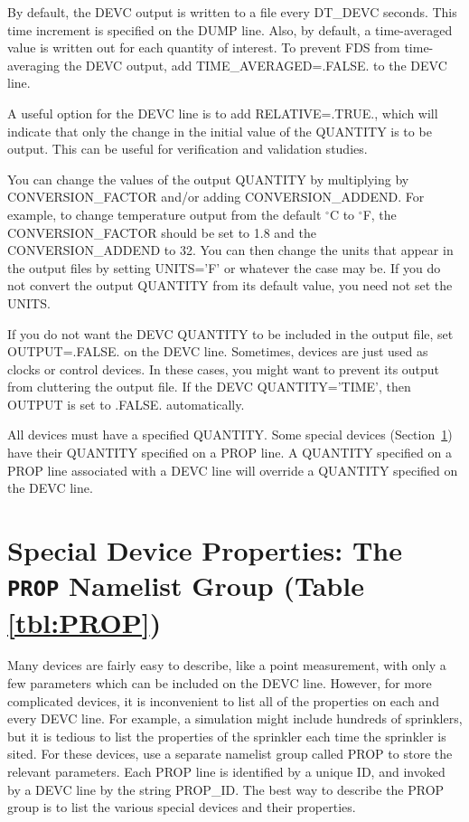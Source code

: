 \documentclass[11pt]{book}
\begin{document}
By default, the {\ct DEVC} output is written to a file every {\ct DT\_DEVC} seconds. This time increment is specified on the {\ct DUMP} line. Also, by default, a time-averaged value is written out for each quantity of interest. To prevent FDS from time-averaging the {\ct DEVC} output, add {\ct TIME\_AVERAGED=.FALSE.} to the {\ct DEVC} line.

A useful option for the {\ct DEVC} line is to add {\ct RELATIVE=.TRUE.}, which will indicate that only the change in the initial value of the {\ct QUANTITY} is to be output. This can be useful for verification and validation studies.

You can change the values of the output {\ct QUANTITY} by multiplying by {\ct CONVERSION\_FACTOR} and/or adding {\ct CONVERSION\_ADDEND}. For example, to change temperature output from the default $^\circ$C to $^\circ$F, the {\ct CONVERSION\_FACTOR} should be set to 1.8 and the {\ct CONVERSION\_ADDEND} to 32. You can then change the units that appear in the output files by setting {\ct UNITS='F'} or whatever the case may be. If you do not convert the output {\ct QUANTITY} from its default value, you need not set the {\ct UNITS}.

If you do not want the {\ct DEVC} {\ct QUANTITY} to be included in the output file, set {\ct OUTPUT=.FALSE.} on the {\ct DEVC} line. Sometimes, devices are just used as clocks or control devices. In these cases, you might want to prevent its output from cluttering the output file. If the {\ct DEVC} {\ct QUANTITY='TIME'}, then {\ct OUTPUT} is set to {\ct .FALSE.} automatically.

All devices must have a specified {\ct QUANTITY}.  Some special devices (Section~\ref{info:PROP}) have their {\ct QUANTITY} specified on a {\ct PROP} line. A {\ct QUANTITY} specified on a {\ct PROP} line associated with a {\ct DEVC} line will override a {\ct QUANTITY} specified on the {\ct DEVC} line.



\newpage

\section{Special Device Properties: The \texorpdfstring{{\tt PROP}}{PROP} Namelist Group (Table \ref{tbl:PROP})}
\label{info:PROP}

Many devices are fairly easy to describe, like a point measurement, with only a few parameters which can be included on the {\ct DEVC} line. However, for more complicated devices, it is inconvenient to list all of the properties on each and every {\ct DEVC} line. For example, a simulation might include hundreds of sprinklers, but it is tedious to list the properties of the sprinkler each time the sprinkler is sited. For these devices, use a separate namelist group called {\ct PROP} to store the relevant parameters. Each {\ct PROP} line is identified by a unique {\ct ID}, and invoked by a {\ct DEVC} line by the string {\ct PROP\_ID}. The best way to describe the {\ct PROP} group is to list the various special devices and their properties.
\end{document}
